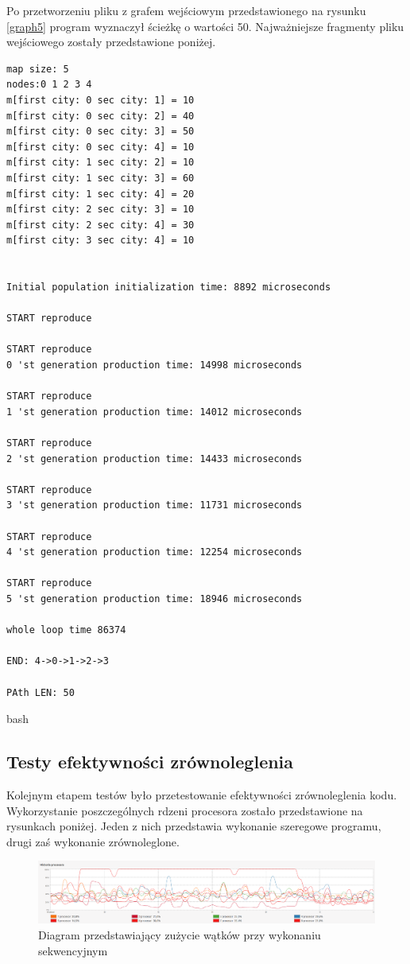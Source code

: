 \documentclass[10pt,a4paper]{article}
\begin{document}
Po przetworzeniu pliku z grafem wejściowym przedstawionego na rysunku \ref{graph5} program wyznaczył ścieżkę o wartości 50. Najważniejsze fragmenty pliku wejściowego zostały przedstawione poniżej.

\begin{verbatim}
map size: 5
nodes:0 1 2 3 4 
m[first city: 0 sec city: 1] = 10
m[first city: 0 sec city: 2] = 40
m[first city: 0 sec city: 3] = 50
m[first city: 0 sec city: 4] = 10
m[first city: 1 sec city: 2] = 10
m[first city: 1 sec city: 3] = 60
m[first city: 1 sec city: 4] = 20
m[first city: 2 sec city: 3] = 10
m[first city: 2 sec city: 4] = 30
m[first city: 3 sec city: 4] = 10


Initial population initialization time: 8892 microseconds

START reproduce

START reproduce
0 'st generation production time: 14998 microseconds

START reproduce
1 'st generation production time: 14012 microseconds

START reproduce 
2 'st generation production time: 14433 microseconds

START reproduce
3 'st generation production time: 11731 microseconds

START reproduce 
4 'st generation production time: 12254 microseconds

START reproduce
5 'st generation production time: 18946 microseconds

whole loop time 86374

END: 4->0->1->2->3

PAth LEN: 50
\end{verbatim}{bash}

\subsection{Testy efektywności zrównoleglenia}
Kolejnym etapem testów było przetestowanie efektywności zrównoleglenia kodu. Wykorzystanie poszczególnych rdzeni procesora zostało przedstawione na rysunkach poniżej. Jeden z nich przedstawia wykonanie szeregowe programu, drugi zaś wykonanie zrównoleglone.


\begin{figure}[H]
\includegraphics[scale=0.18]{zrzutSequence.png}
\centering
\caption{\label{diagramSequence}Diagram przedstawiający zużycie wątków przy wykonaniu sekwencyjnym}
\end{figure}
\end{document}
